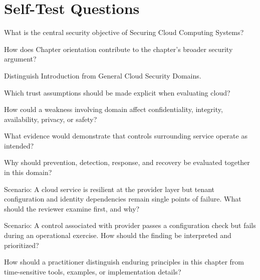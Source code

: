 \documentclass[11pt,letterpaper]{article}
\begin{document}
\section*{Self-Test Questions}
\begin{CornellRecallList}
\item What is the central security objective of Securing Cloud Computing Systems?
\item How does Chapter orientation contribute to the chapter's broader security argument?
\item Distinguish Introduction from General Cloud Security Domains.
\item Which trust assumptions should be made explicit when evaluating cloud?
\item How could a weakness involving domain affect confidentiality, integrity, availability, privacy, or safety?
\item What evidence would demonstrate that controls surrounding service operate as intended?
\item Why should prevention, detection, response, and recovery be evaluated together in this domain?
\item Scenario: A cloud service is resilient at the provider layer but tenant configuration and identity dependencies remain single points of failure. What should the reviewer examine first, and why?
\item Scenario: A control associated with provider passes a configuration check but fails during an operational exercise. How should the finding be interpreted and prioritized?
\item How should a practitioner distinguish enduring principles in this chapter from time-sensitive tools, examples, or implementation details?
\end{CornellRecallList}
\end{document}
